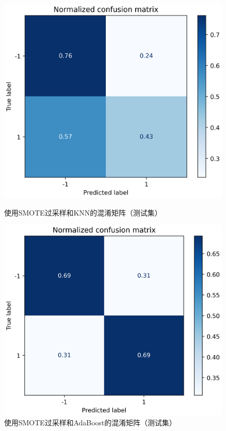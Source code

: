\documentclass[a4paper]{article}
\begin{document}
\begin{figure}[!ht]
\centering
\begin{minipage}[t]{0.48\textwidth}
\centering
    \includegraphics[width=\linewidth]{KNN-re_confus_mat-norm.png}
    \caption{使用SMOTE过采样和KNN的混淆矩阵（测试集）}
    \label{fig:result:knn-re}
\end{minipage}\hfill%
\begin{minipage}[t]{0.48\textwidth}
\centering
    \includegraphics[width=\linewidth]{AdaBoost-re_confus_mat-norm.png}
    \caption{使用SMOTE过采样和AdaBoost的混淆矩阵（测试集）}
    \label{fig:result:ada-re}
\end{minipage}
\end{figure}
\end{document}
